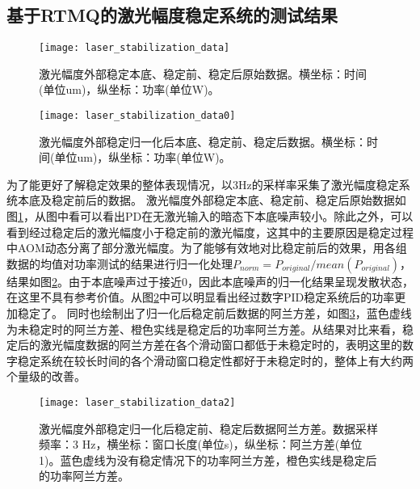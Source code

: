 \subsection[基于RTMQ的激光幅度稳定系统的测试结果]{基于RTMQ的激光幅度稳定系统的测试结果}

\begin{figure}
    \centering
    \texttt{[image: laser\_stabilization\_data]}
    \caption[激光幅度外部稳定原始数据]{激光幅度外部稳定本底、稳定前、稳定后原始数据。横坐标：时间(单位um)，纵坐标：功率(单位W)。\label{fig:laser_stabilization_data}}
\end{figure}

\begin{figure}
    \centering
    \texttt{[image: laser\_stabilization\_data0]}
    \caption[激光幅度外部稳定归一化后数据]{激光幅度外部稳定归一化后本底、稳定前、稳定后数据。横坐标：时间(单位um)，纵坐标：功率(单位W)。\label{fig:laser_stabilization_data0}}
\end{figure}

为了能更好了解稳定效果的整体表现情况，以3Hz的采样率采集了激光幅度稳定系统本底及稳定前后的数据。
激光幅度外部稳定本底、稳定前、稳定后原始数据如图\ref{fig:laser_stabilization_data}，从图中看可以看出PD在无激光输入的暗态下本底噪声较小。除此之外，可以看到经过稳定后的激光幅度小于稳定前的激光幅度，这其中的主要原因是稳定过程中AOM动态分离了部分激光幅度。为了能够有效地对比稳定前后的效果，用各组数据的均值对功率测试的结果进行归一化处理$P_{norm}=P_{original}/mean(P_{original})$，结果如图\ref{fig:laser_stabilization_data0}。由于本底噪声过于接近0，因此本底噪声的归一化结果呈现发散状态，在这里不具有参考价值。从图\ref{fig:laser_stabilization_data0}中可以明显看出经过数字PID稳定系统后的功率更加稳定了。
同时也绘制出了归一化后稳定前后数据的阿兰方差，如图\ref{fig:laser_stabilization_data2}，蓝色虚线为未稳定时的阿兰方差、橙色实线是稳定后的功率阿兰方差。从结果对比来看，稳定后的激光幅度数据的阿兰方差在各个滑动窗口都低于未稳定时的，表明这里的数字稳定系统在较长时间的各个滑动窗口稳定性都好于未稳定时的，整体上有大约两个量级的改善。


\begin{figure}
    \centering
    \texttt{[image: laser\_stabilization\_data2]}
    \caption[激光幅度外部稳定阿兰方差对比数据]{激光幅度外部稳定归一化后稳定前、稳定后数据阿兰方差。数据采样频率：3 Hz，横坐标：窗口长度(单位s)，纵坐标：阿兰方差(单位1)。蓝色虚线为没有稳定情况下的功率阿兰方差，橙色实线是稳定后的功率阿兰方差。\label{fig:laser_stabilization_data2}}
\end{figure}

